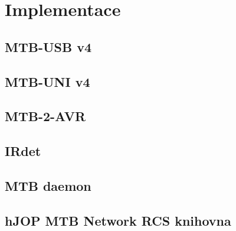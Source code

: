 \section{Implementace}

\subsection{MTB-USB v4}


\subsection{MTB-UNI v4}


\subsection{MTB-2-AVR}


\subsection{IRdet}


\subsection{MTB daemon}


\subsection{hJOP MTB Network RCS knihovna}
